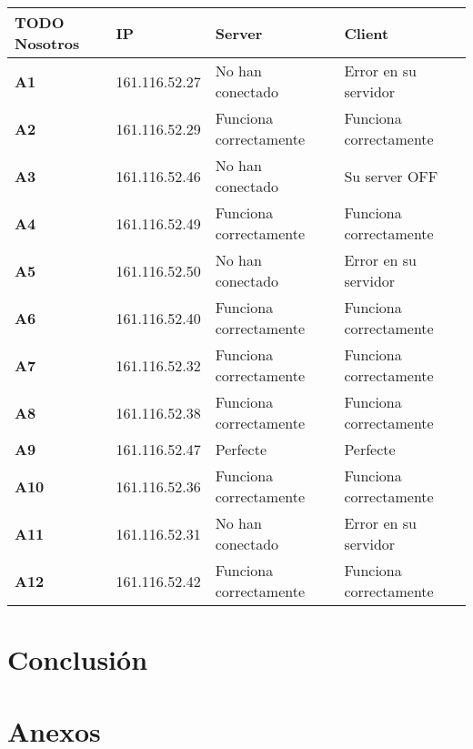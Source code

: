 \begin{center}
    \begin{tabular}{| l || l | l | l |}
    \hline
    \textbf{TODO}
    \textbf{Nosotros} & \textbf{IP} & \textbf{Server} & \textbf{Client} \\ \hline
    \textbf{A1} & 161.116.52.27 & No han conectado  & Error en su servidor \\ \hline
       \textbf{A2} & 161.116.52.29 &  Funciona correctamente & Funciona correctamente\\ \hline
       \textbf{A3}     & 161.116.52.46 & No han conectado   & Su server OFF\\ \hline
       \textbf{A4}     & 161.116.52.49 & Funciona correctamente  & Funciona correctamente\\ \hline
       \textbf{A5}     & 161.116.52.50 & No han conectado   & Error en su servidor\\ \hline
       \textbf{A6}     & 161.116.52.40 & Funciona correctamente  & Funciona correctamente\\ \hline
       \textbf{A7}     & 161.116.52.32 & Funciona correctamente  & Funciona correctamente\\ \hline
       \textbf{A8}     & 161.116.52.38 & Funciona correctamente  & Funciona correctamente\\ \hline
       \textbf{A9}     & 161.116.52.47 & Perfecte  & Perfecte\\ \hline
       \textbf{A10}     & 161.116.52.36 &  Funciona correctamente & Funciona correctamente\\ \hline
       \textbf{A11}     & 161.116.52.31 & No han conectado   & Error en su servidor\\ \hline
       \textbf{A12}     & 161.116.52.42 & Funciona correctamente  & Funciona correctamente\\ \hline
    \end{tabular}
\end{center}



\newpage
\section{Conclusión}


\newpage
\section{Anexos}


